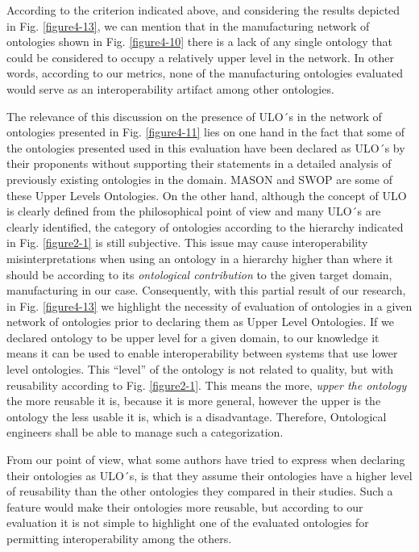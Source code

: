 According to the criterion indicated above, and considering the results depicted in Fig. \ref{figure4-13}, we can mention that in the manufacturing network of ontologies shown in Fig. \ref{figure4-10} there is a lack of any single ontology that could be considered to occupy a relatively upper level in the network. In other words, according to our metrics, none of the manufacturing ontologies evaluated would serve as an interoperability artifact among other ontologies. 

The relevance of this discussion on the presence of ULO´s in the network of ontologies presented in Fig. \ref{figure4-11} lies on one hand in the fact that some of the ontologies presented used in this evaluation have been declared as ULO´s by their proponents without supporting   their statements in a detailed analysis of previously existing ontologies in the domain. MASON and SWOP are some of these Upper Levels Ontologies. On the other   hand, although the concept of ULO is clearly defined from the philosophical point of view and many ULO´s are clearly identified, the category of ontologies according to the hierarchy indicated in Fig. \ref{figure2-1}  is still subjective. This issue may cause interoperability misinterpretations when using an ontology in a hierarchy higher than where it should be according to its \textit{ontological contribution} to the given target domain, manufacturing in our case. Consequently, with this partial result of our research, in Fig. \ref{figure4-13} we highlight the necessity of evaluation of ontologies in a given network of ontologies  prior to declaring them as Upper Level Ontologies. If we declared ontology to be upper level for a given domain, to our knowledge it means it can be used to enable interoperability between systems that use lower level ontologies. This “level” of the ontology is not related to quality, but with reusability according to Fig. \ref{figure2-1}. This means the more, \textit{upper the ontology} the more reusable it is, because it is more general, however the upper is the ontology the less usable it is, which is a disadvantage. Therefore, Ontological engineers shall be able to manage such a categorization. 

From our point of view, what some authors have tried to express when declaring their ontologies as ULO´s, is that they assume their ontologies have a higher level of reusability than the other ontologies they compared in their studies. Such a feature would make their ontologies more reusable, but according to our evaluation it is not simple to highlight one of the evaluated ontologies for permitting interoperability among the others. 

